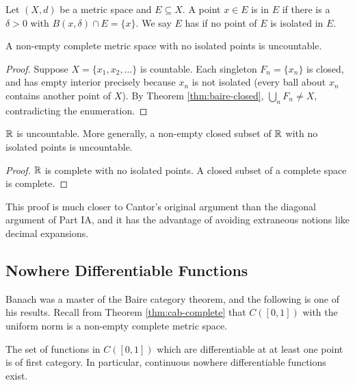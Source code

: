 \documentclass[a4paper]{scrartcl}
\begin{document}
\begin{definition}
	Let $(X,d)$ be a metric space and $E\subseteq X$. A point $x \in E$ is  in $E$ if there is a $\delta>0$ with $B(x,\delta)\cap E = \{x\}$. We say $E$ has  if no point of $E$ is isolated in $E$.
\end{definition}

\begin{theorem}\label{thm:no-isolated-uncountable}
	A non-empty complete metric space with no isolated points is uncountable.
\end{theorem}

\begin{proof}
	Suppose $X = \{x_1,x_2,\ldots\}$ is countable. Each singleton $F_n = \{x_n\}$ is closed, and has empty interior precisely because $x_n$ is not isolated (every ball about $x_n$ contains another point of $X$). By Theorem \ref{thm:baire-closed}, $\bigcup_nF_n\neq X$, contradicting the enumeration.
\end{proof}

\begin{corollary}
	$\mathbb{R}$ is uncountable. More generally, a non-empty closed subset of $\mathbb{R}$ with no isolated points is uncountable.
\end{corollary}

\begin{proof}
	$\mathbb{R}$ is complete with no isolated points. A closed subset of a complete space is complete.
\end{proof}

This proof is much closer to Cantor's original argument than the diagonal argument of Part IA, and it has the advantage of avoiding extraneous notions like decimal expansions.

\subsection{Nowhere Differentiable Functions}

Banach was a master of the Baire category theorem, and the following is one of his results. Recall from Theorem \ref{thm:cab-complete} that $C([0,1])$ with the uniform norm is a non-empty complete metric space.

\begin{theorem}[Banach]\label{thm:nowhere-diff}
	The set of functions in $C([0,1])$ which are differentiable at at least one point is of first category. In particular, continuous nowhere differentiable functions exist.
\end{theorem}
\end{document}
